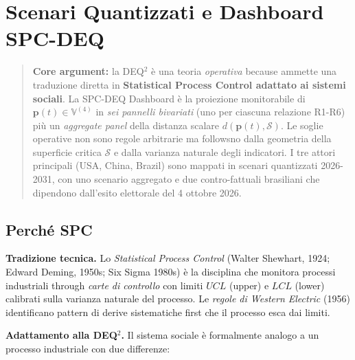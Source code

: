 \chapter{Scenari Quantizzati e Dashboard
SPC-DEQ}\label{scenari-quantizzati-e-dashboard-spc-deq}

\begin{quote}
\textbf{Core argument:} la DEQ$^2$ è una teoria \emph{operativa}
because ammette una traduzione diretta in \textbf{Statistical Process
Control adattato ai sistemi sociali}. La SPC-DEQ Dashboard è la
proiezione monitorabile di \(\boldsymbol{p}(t) \in \mathbb{V}^{(4)}\) in
\emph{sei pannelli bivariati} (uno per ciascuna relazione R1-R6) più un
\emph{aggregate panel} della distanza scalare
\(d(\boldsymbol{p}(t), \mathcal{S})\). Le soglie operative non sono
regole arbitrarie ma followsno dalla geometria della superficie critica
\(\mathcal{S}\) e dalla varianza naturale degli indicatori. I tre attori
principali (USA, China, Brazil) sono mappati in scenari quantizzati
2026-2031, con uno scenario aggregato e due contro-fattuali brasiliani
che dipendono dall'esito elettorale del 4 ottobre 2026.
\end{quote}



\section{Perché SPC}\label{perchuxe9-spc}

\Hypoth{} \textbf{Tradizione tecnica.} Lo \emph{Statistical Process
Control} (Walter Shewhart, 1924; Edward Deming, 1950s; Six Sigma 1980s)
è la disciplina che monitora processi industriali through \emph{carte di
controllo} con limiti \(UCL\) (upper) e \(LCL\) (lower) calibrati sulla
varianza naturale del processo. Le \emph{regole di Western Electric}
(1956) identificano pattern di derive sistematiche first che il processo
esca dai limiti.

\Hypoth{} \textbf{Adattamento alla DEQ$^2$.} Il sistema sociale è
formalmente analogo a un processo industriale con due differenze:


